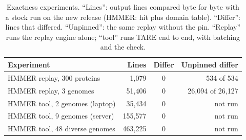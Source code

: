 \documentclass[letterpaper,twocolumn,10pt]{article}
\theoremstyle{definition}
\newcommand{\sys}{TARE\xspace}
\newcommand{\sys}{PARE\xspace}
\begin{document}
\begin{table}[t]
\caption{Exactness experiments. ``Lines'': output lines compared byte for byte with a stock run on the new release
(HMMER: hit plus domain table). ``Differ'': lines that differed. ``Unpinned'': the same replay without the pin.
``Replay'' runs the replay engine alone; ``tool'' runs \sys end to end, with batching and the check.}
\label{tab:exact}
\centering\footnotesize
\setlength{\tabcolsep}{3pt}
\begin{tabular}{@{}lrcr@{}}
\toprule
Experiment & Lines & Differ & Unpinned differ \\
\midrule
HMMER replay, 300 proteins & 1{,}079 & 0 & 534 of 534 \\
HMMER replay, 3 genomes & 51{,}406 & 0 & 26{,}094 of 26{,}127 \\
HMMER tool, 2 genomes (laptop) & 35{,}434 & 0 & not run \\
HMMER tool, 9 genomes (server) & 155{,}577 & 0 & not run \\
HMMER tool, 48 diverse genomes & 463{,}225 & 0 & not run \\

\end{tabular}
\end{table}
\end{document}
